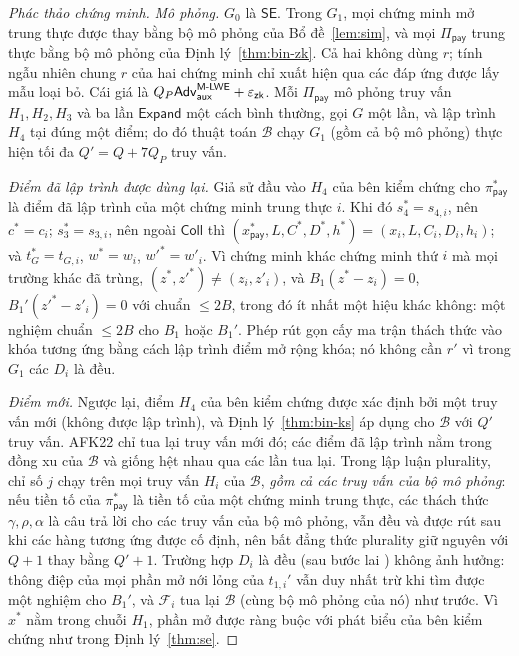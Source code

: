 \begin{proof}[Phác thảo chứng minh]
\emph{Mô phỏng.} $G_0$ là $\mathsf{SE}$. Trong $G_1$, mọi chứng minh mở trung
thực được thay bằng bộ mô phỏng của Bổ đề~\ref{lem:sim}, và mọi
$\Pi_{\mathsf{pay}}$ trung thực bằng bộ mô phỏng của Định lý~\ref{thm:bin-zk}.
Cả hai không dùng $r$; tính ngẫu nhiên chung $r$ của hai chứng minh chỉ xuất hiện
qua các đáp ứng được lấy mẫu loại bỏ. Cái giá là
$Q_P\mathsf{Adv}^{\textsf{M-LWE}}_{\mathsf{aux}}+\varepsilon_{\mathsf{zk}}$. Mỗi $\Pi_{\mathsf{pay}}$ mô phỏng truy
vấn $H_1,H_2,H_3$ và ba lần $\mathsf{Expand}$ một cách bình thường, gọi $G$ một
lần, và lập trình $H_4$ tại đúng một điểm; do đó thuật toán $\mathcal B$ chạy
$G_1$ (gồm cả bộ mô phỏng) thực hiện tối đa $Q'=Q+7Q_P$ truy vấn.

\emph{Điểm đã lập trình được dùng lại.} Giả sử đầu vào $H_4$ của bên kiểm chứng
cho $\pi^*_{\mathsf{pay}}$ là điểm đã lập trình của một chứng minh trung thực
$i$. Khi đó $s_4^*=s_{4,i}$, nên $c^*=c_i$; $s_3^*=s_{3,i}$, nên ngoài
$\mathsf{Coll}$ thì $(x^*_{\mathsf{pay}},L,C^*,D^*,h^*)=(x_i,L,C_i,D_i,h_i)$;
và $t_G^*=t_{G,i}$, $w^*=w_i$, $w'^*=w'_i$. Vì chứng minh khác chứng minh thứ
$i$ mà mọi trường khác đã trùng, $(z^*,z'^*)\ne(z_i,z'_i)$, và
$B_1(z^*-z_i)=0$, $B_1'(z'^*-z'_i)=0$ với chuẩn $\le2B$, trong đó ít nhất một
hiệu khác không: một nghiệm \MSIS{} chuẩn $\le2B$ cho $B_1$ hoặc $B_1'$. Phép
rút gọn cấy ma trận thách thức vào khóa tương ứng bằng cách lập trình điểm mở
rộng khóa; nó không cần $r'$ vì trong $G_1$ các $D_i$ là đều.

\emph{Điểm mới.} Ngược lại, điểm $H_4$ của bên kiểm chứng được xác định bởi một
truy vấn mới (không được lập trình), và Định lý~\ref{thm:bin-ks} áp dụng cho
$\mathcal B$ với $Q'$ truy vấn. AFK22 chỉ tua lại truy vấn mới đó; các điểm đã
lập trình nằm trong đồng xu của $\mathcal B$ và giống hệt nhau qua các lần tua
lại. Trong lập luận plurality, chỉ số $j$ chạy trên mọi truy vấn $H_i$ của
$\mathcal B$, \emph{gồm cả các truy vấn của bộ mô phỏng}: nếu tiền tố của
$\pi^*_{\mathsf{pay}}$ là tiền tố của một chứng minh trung thực, các thách thức
$\gamma,\rho,\alpha$ là câu trả lời cho các truy vấn của bộ mô phỏng, vẫn đều và
được rút sau khi các hàng tương ứng được cố định, nên bất đẳng thức plurality
giữ nguyên với $Q+1$ thay bằng $Q'+1$. Trường hợp $D_i$ là đều (sau bước lai
\MLWE{}) không ảnh hưởng: thông điệp của mọi phần mở nới lỏng của $t_{1,i}'$ vẫn
duy nhất trừ khi tìm được một nghiệm \MSIS{} cho $B_1'$, và
$\mathcal F_i$ tua lại $\mathcal B$ (cùng bộ mô phỏng của nó) như trước.
Vì $x^*$ nằm trong chuỗi $H_1$, phần mở được ràng buộc với phát biểu của bên
kiểm chứng như trong Định lý~\ref{thm:se}.
\end{proof}

